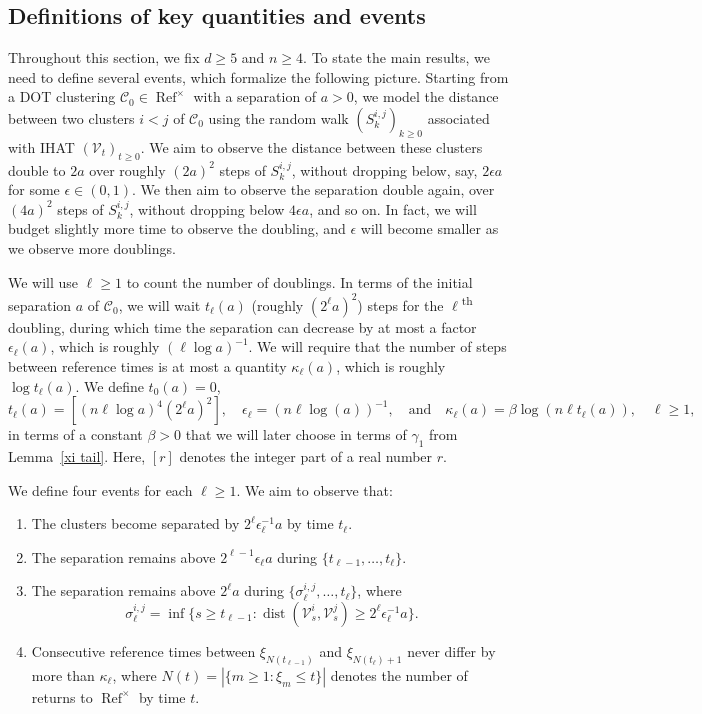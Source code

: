 \documentclass[11pt,reqno]{amsart}
\theoremstyle{definition}
\numberwithin{equation}{section}
\newcommand{\1}{\mathbf{1}}
\newcommand{\eps}{\epsilon}
\DeclareMathOperator{\dist}{dist}
\DeclareMathOperator{\Refcon}{\mathrm{Ref}}
\newcommand{\CC}{\mathcal{C}}
\newcommand{\VV}{\mathcal{V}}
\begin{document}
\subsection{Definitions of key quantities and events}

Throughout this section, we fix $d \geq 5$ and $n \geq 4$. To state the main results, we need to define several events, which formalize the following picture. Starting from a DOT clustering $\CC_0 \in \Refcon^\times$ with a separation of $a > 0$, we model the distance between two clusters $i < j$ of $\CC_0$ using the random walk $(S_k^{i,j})_{k \geq 0}$ associated with IHAT $(\VV_t)_{t \geq 0}$. We aim to observe the distance between these clusters double to $2a$ over roughly $(2a)^2$ steps of $S_k^{i,j}$, without dropping below, say, $2 \eps a$ for some $\eps \in (0,1)$. We then aim to observe the separation double again, over $(4a)^2$ steps of $S_k^{i,j}$, without dropping below $4 \eps a$, and so on. In fact, we will budget slightly more time to observe the doubling, and $\eps$ will become smaller as we observe more doublings.

We will use $\ell \geq 1$ to count the number of doublings. In terms of the initial separation $a$ of $\CC_0$, we will wait $t_\ell (a)$ (roughly $(2^\ell a)^2$) steps for the $\ell$\textsuperscript{th} doubling, during which time the separation can decrease by at most a factor $\eps_\ell (a)$, which is roughly $(\ell \log a)^{-1}$. We will require that the number of steps between reference times is at most a quantity $\kappa_\ell (a)$, which is roughly $\log t_\ell (a)$. We define $t_0 (a) = 0$, 
\[
t_\ell (a) = [(n\ell \log a)^4 (2^\ell a)^2 ], \quad \eps_\ell = (n \ell \log (a))^{-1}, \quad \text{and} \quad \kappa_\ell (a) = \beta \log (n \ell t_\ell (a)), \quad \ell \geq 1,
\]
in terms of a constant $\beta > 0$ that we will later choose in terms of $\gamma_1$ from Lemma~\ref{xi tail}. Here, $[r]$ denotes the integer part of a real number $r$. 

We define four events for each $\ell \geq 1$. We aim to observe that:
\begin{enumerate}
\item The clusters become separated by $2^\ell \eps_\ell^{-1} a$ by time $t_\ell$.
\item The separation remains above $2^{\ell-1} \eps_\ell a$ during $\{t_{\ell-1}, \dots, t_\ell\}$.
\item The separation remains above $2^\ell a$ during $\{\sigma_\ell^{i,j}, \dots, t_\ell\}$, where
\[
\sigma_\ell^{i,j} = \inf \{ s \geq t_{\ell-1}: \dist (\VV_s^i, \VV_s^j) \geq 2^\ell \eps_\ell^{-1} a\}. 
\]
\item Consecutive reference times between $\xi_{N(t_{\ell-1})}$ and $\xi_{N(t_\ell)+1}$ never differ by more than $\kappa_\ell$, where $N(t) = |\{m \geq 1: \xi_m \leq t\}|$ denotes the number of returns to $\Refcon^\times$ by time $t$.
\end{enumerate}
\end{document}
